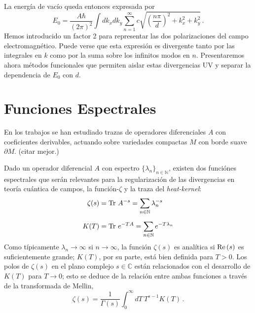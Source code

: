 La energía de vacío queda entonces expresada por
\begin{equation}
E _0 = \frac{A \hbar }{(2 \pi) ^2} \int dk _x dk _y 
\sum _{n=1} ^{\infty} 
c
\sqrt{
		\left( \frac{n \pi}{d} \right) ^2 + k _x ^2 + k _y ^2
		}\,.
\end{equation}
Hemos introducido un factor 2 para representar las dos polarizaciones del campo electromagnético. Puede verse que esta expresión es divergente tanto por las integrales en $k$ como por la suma sobre los infinitos modos en $n$. Presentaremos ahora métodos funcionales que permiten aislar estas divergencias UV y separar la dependencia de $E_0$ con $d$.

\section{Funciones Espectrales}

{\magenta En los trabajos \cite{Seeley:1967ea,10.2307/2373309,10.2307/2373312} se han estudiado trazas de operadores diferenciales $A$ con coeficientes derivables, actuando sobre variedades compactas $M$ con borde suave $\partial M$.} {\red (citar mejor.)}

Dado un operador diferencial $A$ con espectro $\{ \lambda _n \} _{n \in \mathbb N}$, existen dos funciónes espectrales que serán relevantes para la regularización de las divergencias en teoría cuántica de campos, la función-$\zeta$ y la traza del {\it heat-kernel}:
\begin{align}
\zeta  (s) &= {\rm Tr}\ A ^{-s} = \sum \limits_{n \in \mathbb N}   \lambda _n ^{-s} \label{funcion.zeta}\\[2mm]
K (T) &=  {\rm Tr} \ e ^{-T A} = \sum \limits_{n \in \mathbb N} e ^{-T \lambda _{n} }
\end{align}
Como típicamente $\lambda_n\to \infty$ si $n\to \infty$, la función $\zeta  (s) $ es analítica si ${\rm Re}\,(s)$ es suficientemente grande; $K(T)$, por su parte, está bien definida para $T>0$. Los polos de $\zeta(s)$ en el plano complejo $s\in\mathbb C$ están relacionados con el desarrollo de $K(T)$ para $T\to 0$; esto se deduce de la relación entre ambas funciones a través de la transformada de Mellin,
\begin{equation}
\zeta (s) = \frac{1}{\Gamma (s) } 
\int _0 ^{\infty} dT \
T^{s-1} K(T) \,.
\end{equation}

